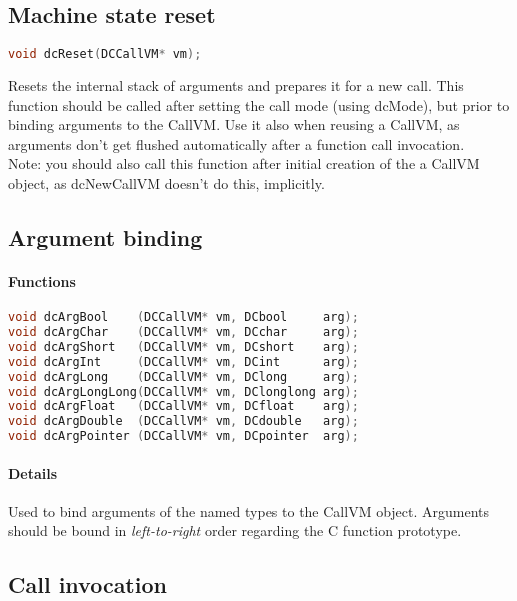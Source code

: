 \subsection{Machine state reset}

\begin{lstlisting}[language=c]
void dcReset(DCCallVM* vm);
\end{lstlisting}


Resets the internal stack of arguments and prepares it for a new call.
This function should be called after setting the call mode (using dcMode), but
prior to binding arguments to the CallVM. Use it also when reusing a CallVM, as
arguments don't get flushed automatically after a function call invocation.\\
Note: you should also call this function after initial creation of the a CallVM
object, as dcNewCallVM doesn't do this, implicitly.\\

\subsection{Argument binding}

\paragraph{Functions}

\begin{lstlisting}[language=c]
void dcArgBool    (DCCallVM* vm, DCbool     arg);
void dcArgChar    (DCCallVM* vm, DCchar     arg);
void dcArgShort   (DCCallVM* vm, DCshort    arg);
void dcArgInt     (DCCallVM* vm, DCint      arg);
void dcArgLong    (DCCallVM* vm, DClong     arg);
void dcArgLongLong(DCCallVM* vm, DClonglong arg);
void dcArgFloat   (DCCallVM* vm, DCfloat    arg);
void dcArgDouble  (DCCallVM* vm, DCdouble   arg);
void dcArgPointer (DCCallVM* vm, DCpointer  arg);
\end{lstlisting}

\paragraph{Details}

Used to bind arguments of the named types to the CallVM object.
Arguments should be bound in \emph{left-to-right} order regarding the C
function prototype.\\

\subsection{Call invocation}

